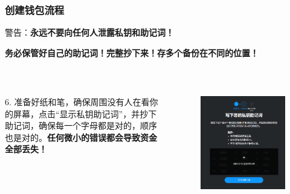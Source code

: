 \documentclass{beamer}
\begin{document}
\begin{frame}
    \frametitle{创建钱包流程}

    警告：\textbf{永远不要向任何人泄露私钥和助记词！}

    \textbf{务必保管好自己的助记词！完整抄下来！存多个备份在不同的位置！}

    \


    \begin{columns}
        \begin{column}{0.5\textwidth}
            6. 准备好纸和笔，确保周围没有人在看你的屏幕，点击“显示私钥助记词”，并抄下助记词，确保每一个字母都是对的，顺序也是对的。\textbf{任何微小的错误都会导致资金全部丢失！}

            \
            
            \
            
            \

            \

            \
        \end{column}
        \begin{column}{0.5\textwidth}
            \begin{figure}
                \centering
                \includegraphics[width=\textwidth]{m6.png}
            \end{figure}
        \end{column}
    \end{columns}

\end{frame}
\end{document}
